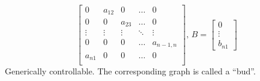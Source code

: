 \documentclass{article}
\begin{document}
\begin{enumerate}
\begin{displaymath}
\begin{bmatrix}
    0&a_{12}&0&\dots& 0\\
    0&0&a_{23}&\dots&0\\
    \vdots&\vdots&\vdots&\ddots&\vdots\\
    0&0&0&\dots&a_{n-1,n}\\
    a_{n1}&0&0&\dots&0\\
  \end{bmatrix},\,B = \begin{bmatrix}
    0\\
    \vdots\\
    b_{n1}
  \end{bmatrix}
\end{displaymath}
Generically controllable. The corresponding graph is called a ``bud''.
\end{enumerate}
\end{document}
